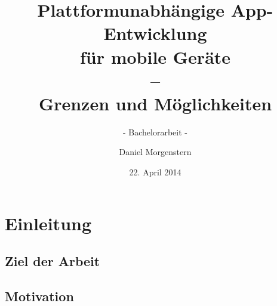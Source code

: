 \documentclass[bibtotoc]{scrreprt}
\title{Plattformunabhängige App-Entwicklung \\ für mobile Geräte \\--\\ Grenzen und Möglichkeiten}
\subtitle{- Bachelorarbeit -}
\author{Daniel Morgenstern}
\date{22. April 2014}
\begin{document}
   \maketitle
   \tableofcontents

\chapter{Einleitung}

\section{Ziel der Arbeit}

\section{Motivation} %

\begin{comment}
Bei der Entwicklung mobiler Anwendungen steht - besonders im Consumer-Bereich - neben vielen anderen Entscheidungen die Wahl der Ziel-Plattform an, wobei ein wichtiger Faktor sicher die Erreichbarkeit einer möglichst großen Nutzer-Anzahl darstellt.
Vermutlich um den  Entwicklungsaufwand nicht ins Bodenlose \todo{Stil!} ausufern zu lassen beschränken sich dabei viele App-Hersteller (oder -anbieter) auf die größten, meist genutzten Plattformen wie Android oder iOS. \todo{darf man so eine Behauptung jetzt einfach machen? oder wie weißt man sowas nach?}

Doch nicht nur, dass dadurch doppelter Wartungs- und Anpassungsaufwand für die Entwicklung entsteht, auch werden dadurch viele andere Betriebssysteme vernachlässigt, was letztlich zu Lasten der Nutzer geht, die auf einem vielfältigen aber auch diffundierten Markt - je nach Hersteller und Plattform - ein zum Teil eingeschränktes und ungleich verteiltes Angebot an Anwendungen vorfinden. 

Auf der anderen Seite hat der Bereich der Webentwicklung und -gestaltung in den letzten Jahren seit Aufkommen von Smartphones und Tablets eine neue Anforderung hinzu bekommen: Websites müssen nicht mehr nur für die unterschiedlichsten Browser auf dem Desktop angepasst werden, sondern sollen sich auch auf Geräten, die für Touch-Bedienung ausgelegt sind unterschiedlicher Bildschirmgrößen gleich gut anfühlen und bedienen lassen. Da der Trend für viele Firmen in Sachen Öffentlichkeitsarbeit, Kundenbindung und -freundlichkeit neben der Firmen-Website und der eigenen Facebook-Seite auch eine eigene App zu fordern scheint, liegt vor dem zuvor genannten Hintergrund der stark variierenden App-Formate der Ansatz nahe, auch den Webbrowser als eine weitere Plattform im bunten Gefüge aus Deployment-Anforderungen zu sehen, die nach Verminderung und Zusammenführung des Entwicklungsaufwands im mobilen Bereich verlangt. 

Letzterer Ansatz ist allerdings nur einer, den es zu Untersuchen gilt; Zentraler Forschungsgegenstand soll die Exploration der Möglichkeiten und Grenzen der plattformunabhängigen App-Entwicklung anhand eines beispielhaft implementierten Anwendungsfalls sein.
\end{comment}
\end{document}
